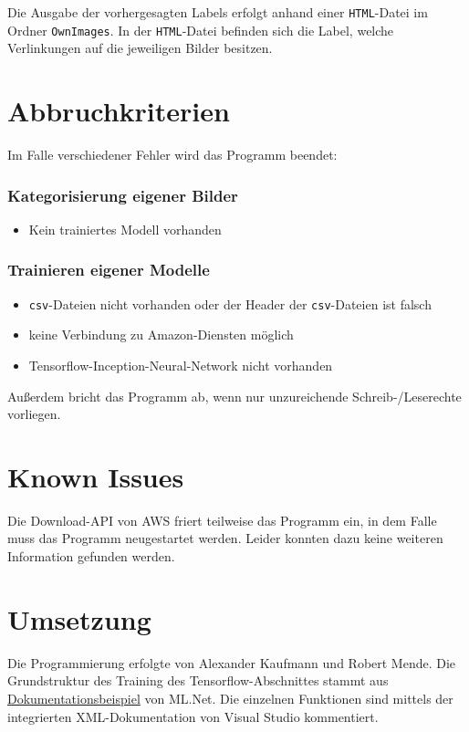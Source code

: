 \documentclass[doktyp=parbeit]{TUBAFarbeiten}
\begin{document}
Die Ausgabe der vorhergesagten Labels erfolgt anhand einer \texttt{HTML}-Datei im Ordner \texttt{OwnImages}. In der \texttt{HTML}-Datei befinden sich die Label, welche Verlinkungen auf die jeweiligen Bilder besitzen.
\section{Abbruchkriterien}
Im Falle verschiedener Fehler wird das Programm beendet:
\subsubsection*{Kategorisierung eigener Bilder}
\begin{itemize}
	\item Kein trainiertes Modell vorhanden
\end{itemize}
\subsubsection*{Trainieren eigener Modelle}	
\begin{itemize}
	\item \texttt{csv}-Dateien nicht vorhanden oder der Header der \texttt{csv}-Dateien ist falsch
	\item keine Verbindung zu Amazon-Diensten möglich
	\item Tensorflow-Inception-Neural-Network nicht vorhanden
\end{itemize}
Außerdem bricht das Programm ab, wenn nur unzureichende Schreib-/Leserechte vorliegen.  
\section{Known Issues}
Die Download-API von AWS friert teilweise das Programm ein, in dem Falle muss das Programm neugestartet werden. Leider konnten dazu keine weiteren Information gefunden werden. 
\section{Umsetzung}
Die Programmierung erfolgte von Alexander Kaufmann und Robert Mende. Die Grundstruktur des Training des Tensorflow-Abschnittes stammt aus \href{https://docs.microsoft.com/de-de/dotnet/machine-learning/tutorials/image-classification}{Dokumentationsbeispiel} von ML.Net. Die einzelnen Funktionen sind mittels der integrierten XML-Dokumentation von Visual Studio kommentiert.  
\end{document}
